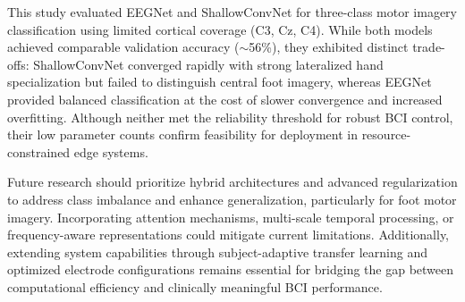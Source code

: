 This study evaluated EEGNet and ShallowConvNet for three-class motor imagery classification using limited cortical coverage (C3, Cz, C4). While both models achieved comparable validation accuracy ($\sim$56\%), they exhibited distinct trade-offs: ShallowConvNet converged rapidly with strong lateralized hand specialization but failed to distinguish central foot imagery, whereas EEGNet provided balanced classification at the cost of slower convergence and increased overfitting. Although neither met the reliability threshold for robust BCI control, their low parameter counts confirm feasibility for deployment in resource-constrained edge systems.

Future research should prioritize hybrid architectures and advanced regularization to address class imbalance and enhance generalization, particularly for foot motor imagery. Incorporating attention mechanisms, multi-scale temporal processing, or frequency-aware representations could mitigate current limitations. Additionally, extending system capabilities through subject-adaptive transfer learning and optimized electrode configurations remains essential for bridging the gap between computational efficiency and clinically meaningful BCI performance.
